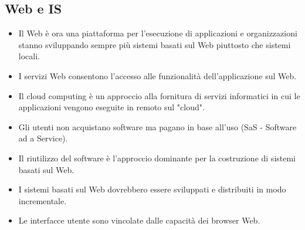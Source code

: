 \subsection{Web e IS}
\begin{itemize}
    \item Il Web è ora una piattaforma per l'esecuzione di applicazioni e organizzazioni stanno sviluppando sempre più sistemi basati sul Web piuttosto che sistemi locali.
    \item I servizi Web consentono l'accesso alle funzionalità dell'applicazione sul Web.
    \item Il cloud computing è un approccio alla fornitura di servizi informatici in cui le applicazioni vengono eseguite in remoto sul "cloud".
    \item Gli utenti non acquistano software ma pagano in base all'uso (SaS - Software ad a Service).
    \item Il riutilizzo del software è l'approccio dominante per la costruzione di sistemi basati sul Web.
    \item I sistemi basati sul Web dovrebbero essere sviluppati e distribuiti in modo incrementale.
    \item Le interfacce utente sono vincolate dalle capacità dei browser Web.
\end{itemize}